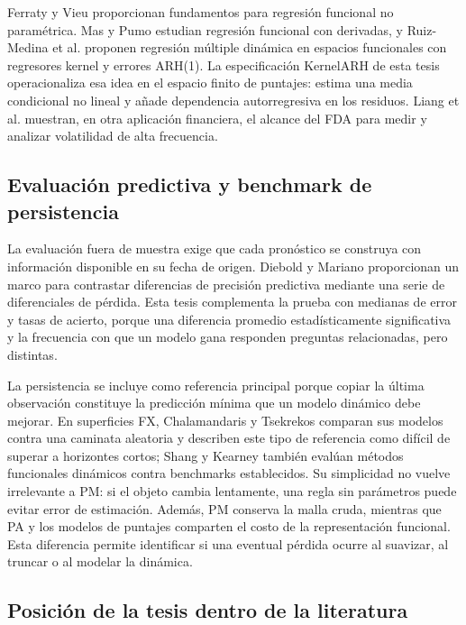 \documentclass[a4paper,11pt]{article}
\begin{document}
Ferraty y Vieu \cite{FerratyVieu2006} proporcionan fundamentos para regresión funcional no paramétrica. Mas y Pumo \cite{MasPumo2009} estudian regresión funcional con derivadas, y Ruiz-Medina et al. \cite{RuizMedina2019} proponen regresión múltiple dinámica en espacios funcionales con regresores kernel y errores ARH(1). La especificación KernelARH de esta tesis operacionaliza esa idea en el espacio finito de puntajes: estima una media condicional no lineal y añade dependencia autorregresiva en los residuos. Liang et al. \cite{Liang2022} muestran, en otra aplicación financiera, el alcance del FDA para medir y analizar volatilidad de alta frecuencia.

\subsection{Evaluación predictiva y benchmark de persistencia}

La evaluación fuera de muestra exige que cada pronóstico se construya con información disponible en su fecha de origen. Diebold y Mariano \cite{DieboldMariano1995} proporcionan un marco para contrastar diferencias de precisión predictiva mediante una serie de diferenciales de pérdida. Esta tesis complementa la prueba con medianas de error y tasas de acierto, porque una diferencia promedio estadísticamente significativa y la frecuencia con que un modelo gana responden preguntas relacionadas, pero distintas.

La persistencia se incluye como referencia principal porque copiar la última observación constituye la predicción mínima que un modelo dinámico debe mejorar. En superficies FX, Chalamandaris y Tsekrekos \cite{ChalamandarisTsekrekos2010} comparan sus modelos contra una caminata aleatoria y describen este tipo de referencia como difícil de superar a horizontes cortos; Shang y Kearney \cite{ShangKearney2022} también evalúan métodos funcionales dinámicos contra benchmarks establecidos. Su simplicidad no vuelve irrelevante a PM: si el objeto cambia lentamente, una regla sin parámetros puede evitar error de estimación. Además, PM conserva la malla cruda, mientras que PA y los modelos de puntajes comparten el costo de la representación funcional. Esta diferencia permite identificar si una eventual pérdida ocurre al suavizar, al truncar o al modelar la dinámica.

\subsection{Posición de la tesis dentro de la literatura}
\end{document}
